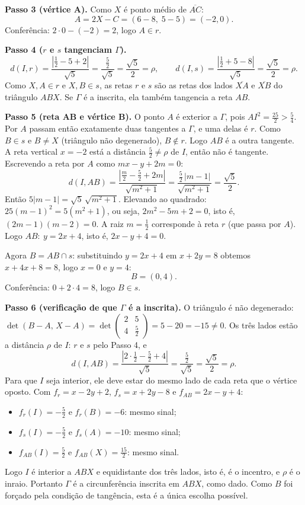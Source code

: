 \documentclass{article}%
\begin{document}
\textbf{Passo 3 (vértice A).} Como $X$ é ponto médio de $\overline{AC}$:
\[
A=2X-C=(6-8,\;5-5)=(-2,0).
\]
Conferência: $2\cdot0-(-2)=2$, logo $A\in r$.

\textbf{Passo 4 ($r$ e $s$ tangenciam $\Gamma$).}
\[
d(I,r)=\frac{\left|\tfrac12-5+2\right|}{\sqrt5}=\frac{\tfrac52}{\sqrt5}=\frac{\sqrt5}{2}=\rho,
\qquad
d(I,s)=\frac{\left|\tfrac12+5-8\right|}{\sqrt5}=\frac{\sqrt5}{2}=\rho.
\]
Como $X,A\in r$ e $X,B\in s$, as retas $r$ e $s$ são as retas dos lados $\overline{XA}$ e $\overline{XB}$ do triângulo $ABX$. Se $\Gamma$ é a inscrita, ela também tangencia a reta $AB$.

\textbf{Passo 5 (reta AB e vértice B).} O ponto $A$ é exterior a $\Gamma$, pois $AI^2=\tfrac{25}{2}>\tfrac54$. Por $A$ passam então exatamente duas tangentes a $\Gamma$, e uma delas é $r$. Como $B\in s$ e $B\neq X$ (triângulo não degenerado), $B\notin r$. Logo $AB$ é a outra tangente. A reta vertical $x=-2$ está a distância $\tfrac52\neq\rho$ de $I$, então não é tangente. Escrevendo a reta por $A$ como $mx-y+2m=0$:
\[
d(I,AB)=\frac{\left|\tfrac m2-\tfrac52+2m\right|}{\sqrt{m^2+1}}=\frac{\tfrac52\,|m-1|}{\sqrt{m^2+1}}=\frac{\sqrt5}{2}.
\]
Então $5|m-1|=\sqrt5\,\sqrt{m^2+1}$. Elevando ao quadrado: $25(m-1)^2=5(m^2+1)$, ou seja, $2m^2-5m+2=0$, isto é, $(2m-1)(m-2)=0$. A raiz $m=\tfrac12$ corresponde à reta $r$ (que passa por $A$). Logo $AB:\ y=2x+4$, isto é, $2x-y+4=0$.

Agora $B=AB\cap s$: substituindo $y=2x+4$ em $x+2y=8$ obtemos $x+4x+8=8$, logo $x=0$ e $y=4$:
\[
B=(0,4).
\]
Conferência: $0+2\cdot4=8$, logo $B\in s$.

\textbf{Passo 6 (verificação de que $\Gamma$ é a inscrita).} O triângulo é não degenerado: $\det(B-A,\,X-A)=\det\begin{pmatrix}2&5\\4&\tfrac52\end{pmatrix}=5-20=-15\neq0$. Os três lados estão a distância $\rho$ de $I$: $r$ e $s$ pelo Passo 4, e
\[
d(I,AB)=\frac{\left|2\cdot\tfrac12-\tfrac52+4\right|}{\sqrt5}=\frac{\tfrac52}{\sqrt5}=\frac{\sqrt5}{2}=\rho.
\]
Para que $I$ seja interior, ele deve estar do mesmo lado de cada reta que o vértice oposto. Com $f_r=x-2y+2$, $f_s=x+2y-8$ e $f_{AB}=2x-y+4$:
\begin{itemize}
\item $f_r(I)=-\tfrac52$ e $f_r(B)=-6$: mesmo sinal;
\item $f_s(I)=-\tfrac52$ e $f_s(A)=-10$: mesmo sinal;
\item $f_{AB}(I)=\tfrac52$ e $f_{AB}(X)=\tfrac{15}{2}$: mesmo sinal.
\end{itemize}
Logo $I$ é interior a $ABX$ e equidistante dos três lados, isto é, é o incentro, e $\rho$ é o inraio. Portanto $\Gamma$ é a circunferência inscrita em $ABX$, como dado. Como $B$ foi forçado pela condição de tangência, esta é a única escolha possível.
\end{document}
